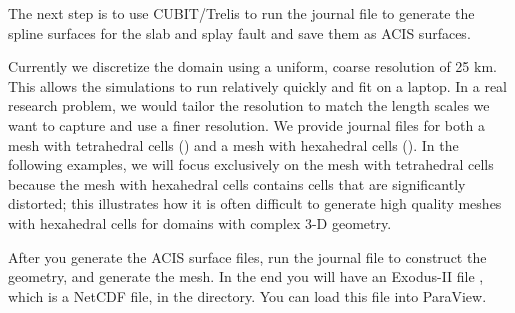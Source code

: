 
The next step is to use CUBIT/Trelis to run the
 journal file to generate the spline
surfaces for the slab and splay fault and save them as ACIS
surfaces. 


Currently we discretize the domain using a uniform, coarse resolution
of 25 km. This allows the simulations to run relatively quickly and
fit on a laptop. In a real research problem, we would tailor the
resolution to match the length scales we want to capture and use a
finer resolution. We provide journal files for both a mesh with
tetrahedral cells () and a mesh with
hexahedral cells (). In the following
examples, we will focus exclusively on the mesh with tetrahedral cells
because the mesh with hexahedral cells contains cells that are
significantly distorted; this illustrates how it is often difficult to
generate high quality meshes with hexahedral cells for domains with
complex 3-D geometry.

After you generate the ACIS surface files, run the
 journal file to construct the geometry, and
generate the mesh. In the end you will have an Exodus-II file
, which is a NetCDF file, in the
 directory. You can load this file into ParaView.


